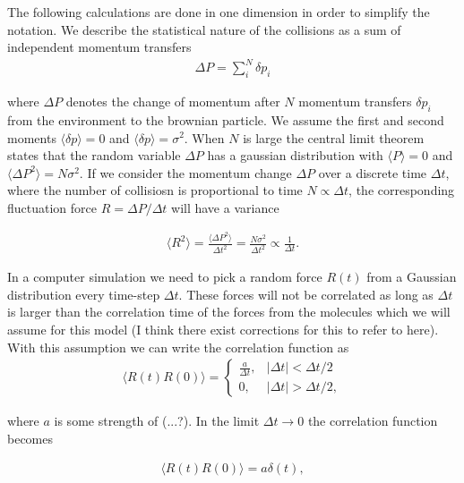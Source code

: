 The following calculations are done in one dimension in order to simplify the
notation. We describe the statistical nature of the collisions as a sum of
independent momentum transfers
\begin{align*}
  \Delta P = \sum_i^N \delta p_i
\end{align*}

where $\Delta P$ denotes the change of momentum after $N$ momentum transfers
$\delta p_i$ from the environment to the brownian particle. We assume the first
and second moments $\langle \delta p \rangle = 0$ and  $\langle \delta p \rangle
= \sigma^2$. When $N$ is large the central limit theorem states that the random
variable $\Delta P$ has a gaussian distribution with  $\langle P \rangle = 0$
and $\langle \Delta P^2 \rangle = N\sigma^2$. If we consider the momentum change
$\Delta P$  over a discrete time $\Delta t$, where the number of collisiosn is
proportional to time $N \propto \Delta t$, the corresponding fluctuation force
$R = \Delta P / \Delta t$ will have a variance 


\begin{align*}
  \langle R^2 \rangle = \frac{\langle \Delta P^2 \rangle}{\Delta t^2} = \frac{N \sigma^2}{\Delta t^2}  \propto \frac{1}{\Delta t}.
\end{align*}

In a computer simulation we need to pick a random force $R(t)$ from a Gaussian
distribution every time-step $\Delta t$. These forces will not be correlated as
long as $\Delta t$ is larger than the correlation time of the forces from the
molecules which we will assume for this model (I think there exist corrections
for this to refer to here). With this assumption we can write the correlation
function as 
\begin{align}
  \langle R(t) R(0) \rangle = 
  \begin{cases}
    \frac{a}{\Delta t}, & |\Delta t| < \Delta t/2 \\
    0, & |\Delta t| > \Delta t/2,
    \label{eq:disc_corr}
  \end{cases}
\end{align}

where $a$ is some strength of (...?). In the limit $\Delta t \to 0$ the
correlation function becomes

\begin{align}
  \langle R(t)R(0) \rangle = a \delta(t),
  \label{eq:F_corr}
\end{align}


